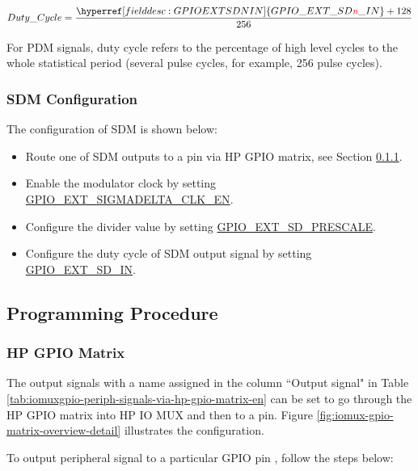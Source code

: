 \documentclass[main\_\_EN.tex]{subfiles}
\begin{document}
    \[
    Duty\_Cycle=\frac{\hyperref[fielddesc:GPIOEXTSDNIN]{GPIO\_EXT\_SD\regindex{n}\_IN} + 128} {256}
    \]

\begin{tiplisting}
For PDM signals, duty cycle refers to the percentage of high level cycles to the whole statistical period (several pulse cycles, for example, 256 pulse cycles).
\end{tiplisting}

\subsubsection{SDM Configuration}

The configuration of SDM is shown below:

\begin{itemize}
    \item Route one of SDM outputs to a pin via HP GPIO matrix, see Section  \ref{sec:programming-procedure-hp-gpio-matrix-output}.
    \item Enable the modulator clock by setting \hyperref[fielddesc:GPIOEXTSIGMADELTACLKEN]{GPIO\_EXT\_SIGMADELTA\_CLK\_EN}.
    \item Configure the divider value by setting \hyperref[fielddesc:GPIOEXTSDNPRESCALE]{GPIO\_EXT\_SD\_PRESCALE}.
    \item Configure the duty cycle of SDM output signal by setting  \hyperref[fielddesc:GPIOEXTSDNIN]{GPIO\_EXT\_SD\_IN}.
\end{itemize}

\subsection{Programming Procedure}

\subsubsection{HP GPIO Matrix}
\label{sec:programming-procedure-hp-gpio-matrix-output}

The output signals with a name assigned in the column ``Output signal" in Table \ref{tab:iomuxgpio-periph-signals-via-hp-gpio-matrix-en} can be set to go through the HP GPIO matrix into HP IO MUX and then to a pin. Figure \ref{fig:iomux-gpio-matrix-overview-detail} illustrates the configuration.

To output peripheral signal  to a particular GPIO pin , follow the steps below:
\end{document}
